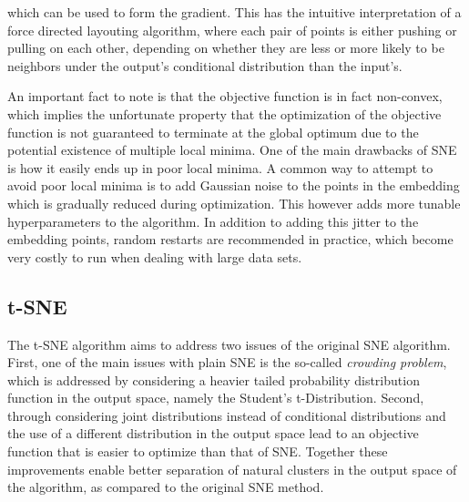which can be used to form the gradient. This has the intuitive interpretation of a force directed layouting algorithm, where each pair of points is either pushing or pulling on each other, depending on whether they are less or more likely to be neighbors under the output's conditional distribution than the input's.

An important fact to note is that the objective function is in fact non-convex, which implies the unfortunate property that the optimization of the objective function is not guaranteed to terminate at the global optimum due to the potential existence of multiple local minima. One of the main drawbacks of SNE is how it easily ends up in poor local minima. A common way to attempt to avoid poor local minima is to add Gaussian noise to the points in the embedding which is gradually reduced during optimization. This however adds more tunable hyperparameters to the algorithm. In addition to adding this jitter to the embedding points, random restarts are recommended in practice, which become very costly to run when dealing with large data sets.

\subsection{t-SNE}
\label{subsection:tsne}

The t-SNE algorithm aims to address two issues of the original SNE algorithm. First, one of the main issues with plain SNE is the so-called \textit{crowding problem}, which is addressed by considering a heavier tailed probability distribution function in the output space, namely the Student's t-Distribution. Second, through considering joint distributions instead of conditional distributions and the use of a different distribution in the output space lead to an objective function that is easier to optimize than that of SNE. Together these improvements enable better separation of natural clusters in the output space of the algorithm, as compared to the original SNE method.

